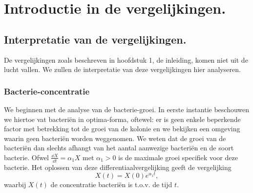

\chapter{Introductie in de vergelijkingen.} 			%
\label{Introductie_vergelijkingen}

\section{Interpretatie van de vergelijkingen.}
De vergelijkingen zoals beschreven in hoofdstuk 1, de inleiding, komen niet uit de lucht vallen. We zullen de interpretatie van deze vergelijkingen hier analyseren.

\subsection*{Bacterie-concentratie}
We beginnen met de analyse van de bacterie-groei. In eerste instantie beschouwen we hiertoe vat bacteri\"en in optima-forma, oftewel: er is geen enkele beperkende factor met betrekking tot de groei van de kolonie en we bekijken een omgeving waarin geen bacteri\"en worden weggenomen. We weten dat de groei van de bacteri\"en dan slechts afhangt van het aantal aanwezige bacteri\"en en de soort bacterie. Ofwel $\frac{\dd X}{\dd t} = \alpha_1X$ met $\alpha_1>0$ is de maximale groei specifiek voor deze bacterie. Het oplossen van deze differentiaalvergelijking geeft de vergelijking
\begin{equation*}
	X(t) = X(0) e^{\alpha_1t},		
\end{equation*}
waarbij $X(t)$ de concentratie bacteri\"en is t.o.v. de tijd $t$.

